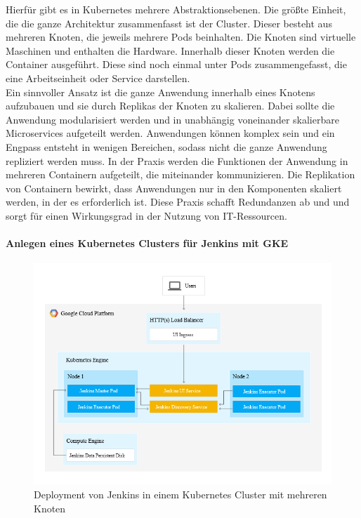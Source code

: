 Hierfür gibt es in Kubernetes mehrere Abstraktionsebenen. Die größte Einheit, die die ganze Architektur zusammenfasst ist der Cluster. Dieser besteht aus mehreren Knoten, die jeweils mehrere Pods beinhalten. Die Knoten sind virtuelle Maschinen und enthalten die Hardware. Innerhalb dieser Knoten werden die Container ausgeführt. Diese sind noch einmal unter Pods zusammengefasst, die eine Arbeitseinheit oder Service darstellen. 
\medskip
\\
Ein sinnvoller Ansatz ist die ganze Anwendung innerhalb eines Knotens aufzubauen und sie durch Replikas der Knoten zu skalieren. Dabei sollte die Anwendung modularisiert werden und in unabhängig voneinander skalierbare Microservices aufgeteilt werden. Anwendungen können komplex sein und ein Engpass entsteht in wenigen Bereichen, sodass nicht die ganze Anwendung repliziert werden muss. In der Praxis werden die Funktionen der Anwendung in mehreren Containern aufgeteilt, die miteinander kommunizieren. Die Replikation von Containern bewirkt, dass Anwendungen nur in den Komponenten skaliert werden, in der es erforderlich ist. Diese Praxis schafft Redundanzen ab und und sorgt für einen Wirkungsgrad in der Nutzung von IT-Ressourcen.

\paragraph{Anlegen eines Kubernetes Clusters für Jenkins mit GKE}
\begin{figure}[htbp]
 \centering
 \includegraphics[width=1.0\textwidth]{gfx/jenkins-kubernetes-architecture.png}
 \caption{Deployment von Jenkins in einem Kubernetes Cluster mit mehreren Knoten \cite{Google:GKEJenkins}\label{fig:gkejenkins}}
\end{figure}

